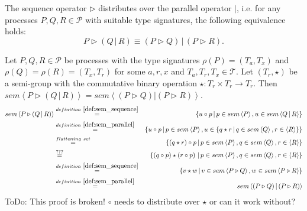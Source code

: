 \begin{theorem}
\label{thm:distributivity_sequence_parallel}
The sequence operator $\triangleright$ distributes over the parallel operator $|$, i.e. for any processes $P, Q, R \in \mathcal{P}$ with suitable type signatures, the following equivalence holds:
\begin{equation*}
  P \triangleright \left( Q \,|\, R \right) \equiv \left( P \triangleright Q \right) \,|\, \left( P \triangleright R \right). 
\end{equation*}
\end{theorem}

\begin{myproof}
Let $P, Q, R \in \mathcal{P}$ be processes with the type signatures $\rho \left( P \right) = \left( T_a, T_x \right)$ and $\rho \left( Q \right) = \rho \left( R \right) = \left( T_x, T_r \right)$ for some $a, r, x$ and $T_a, T_r, T_x \in \mathcal{T}$. Let $\left( T_r, \star \right)$ be a semi-group with the commutative binary operation $\star \colon T_r \times T_r \to T_r$. Then $sem \left\langle P \triangleright \left( Q \,|\, R \right) \right\rangle = sem \left\langle \left( P \triangleright Q \right) | \left( P \triangleright R \right) \right\rangle$.
\begin{eqnarray*}
  sem \left\langle P \triangleright \left( Q \,|\, R \right) \right\rangle & \overset{\defref{def:sem_sequence}}{=} & \left\{ u \circ p \,|\, p \in sem \left\langle P \right\rangle, u \in sem \left\langle Q \,|\, R \right\rangle \right\} \\
  & \overset{\defref{def:sem_parallel}}{=} & \left\{ u \circ p \,|\, p \in sem \left\langle P \right\rangle, u \in \left\{q \star r \,|\, q \in sem \left\langle Q \right\rangle, r \in \left\langle R \right\rangle \right\} \right\} \\
  & \overset{flattening \ set}{=} & \left\{ \left( q \star r \right) \circ p \,|\, p \in sem \left\langle P \right\rangle, q \in sem \left\langle Q \right\rangle, r \in \left\langle R \right\rangle \right\} \\
  & \overset{???}{=} & \left\{ \left( q \circ p \right) \star \left( r \circ p \right) \,|\, p \in sem \left\langle P \right\rangle, q \in sem \left\langle Q \right\rangle, r \in \left\langle R \right\rangle \right\} \\
  & \overset{\defref{def:sem_sequence}}{=} & \left\{ v \star w \,|\, v \in sem \left\langle P \triangleright Q \right\rangle, w \in sem \left\langle P \triangleright R \right\rangle \right\} \\
  & \overset{\defref{def:sem_parallel}}{=} & sem \left\langle \left( P \triangleright Q \right) | \left( P \triangleright R \right) \right\rangle
\end{eqnarray*}
ToDo: This proof is broken! $\circ$ needs to distribute over $\star$ or can it work without?
\end{myproof}


